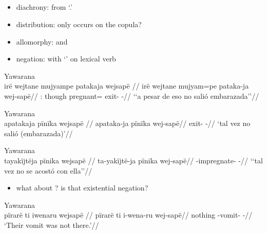 \documentclass{memoir}
\begin{document}
\subsection{\texorpdfstring{}{}}

\begin{itemize}
\tightlist
\item
  diachrony: from  `.'
\item
  distribution: only occurs on the copula?
\item
  allomorphy:  and 
\item
  negation: with  `' on lexical verb
   
\end{itemize}

\ex Yawarana \\
\label{ctoaragrme-38}    \begingl
    \glpreamble irë wejtane mujyampe patakaja wejsapë //
    \gla irë wejtane mujyam=pe pataka-ja wej-sapë//
    \glb {}: though pregnant= exit- -//
        \glft ‘‘a pesar de eso no salió embarazada’’//  
    \endgl 
\xe

\ex Yawarana \\
\label{ctoaragrme-39}    \begingl
    \glpreamble apatakaja pïnïka wejsapë //
    \gla apataka-ja pïnïka wej-sapë//
    \glb exit-  -//
        \glft ‘tal vez no salió (embarazada)’//  
    \endgl 
\xe

\ex Yawarana \\
\label{ctoaragrme-40}    \begingl
    \glpreamble tayakïjtëja pïnika wejsapë //
    \gla ta-yakïjtë-ja pïnika wej-sapë//
    \glb {}-impregnate-  -//
        \glft ‘‘tal vez no se acostó con ella’’//  
    \endgl 
\xe

\begin{itemize}
\tightlist
\item
  what about ? is that existential negation?
\end{itemize}

\ex Yawarana \\
\label{ctorat-19}    \begingl
    \glpreamble pïrarë ti iwenaru wejsapë //
    \gla pïrarë ti i-wena-ru wej-sapë//
    \glb nothing  -vomit- -//
        \glft ‘Their vomit was not there.’//  
    \endgl 
\xe

\subsection{\texorpdfstring{ \label{sec:sareimn}}{ }}
\end{document}
